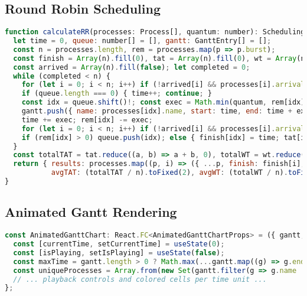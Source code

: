 \documentclass[12pt,a4paper,oneside]{report}
\begin{document}
\subsection*{Round Robin Scheduling}
\begin{lstlisting}[language=JavaScript, caption={Round Robin calculation (excerpt from \texttt{src/app/round-robin/page.tsx}).}]
function calculateRR(processes: Process[], quantum: number): SchedulingResult {
  let time = 0, queue: number[] = [], gantt: GanttEntry[] = [];
  const n = processes.length, rem = processes.map(p => p.burst);
  const finish = Array(n).fill(0), tat = Array(n).fill(0), wt = Array(n).fill(0);
  const arrived = Array(n).fill(false); let completed = 0;
  while (completed < n) {
    for (let i = 0; i < n; i++) if (!arrived[i] && processes[i].arrival <= time) { queue.push(i); arrived[i] = true; }
    if (queue.length === 0) { time++; continue; }
    const idx = queue.shift()!; const exec = Math.min(quantum, rem[idx]);
    gantt.push({ name: processes[idx].name, start: time, end: time + exec });
    time += exec; rem[idx] -= exec;
    for (let i = 0; i < n; i++) if (!arrived[i] && processes[i].arrival <= time) { queue.push(i); arrived[i] = true; }
    if (rem[idx] > 0) queue.push(idx); else { finish[idx] = time; tat[idx] = finish[idx] - processes[idx].arrival; wt[idx] = tat[idx] - processes[idx].burst; completed++; }
  }
  const totalTAT = tat.reduce((a, b) => a + b, 0), totalWT = wt.reduce((a, b) => a + b, 0);
  return { results: processes.map((p, i) => ({ ...p, finish: finish[i], tat: tat[i], wt: wt[i] })),
           avgTAT: (totalTAT / n).toFixed(2), avgWT: (totalWT / n).toFixed(2), gantt };
}
\end{lstlisting}

\subsection*{Animated Gantt Rendering}
\begin{lstlisting}[language=JavaScript, caption={Animated Gantt chart (excerpt from \texttt{src/components/AnimatedGanttChart.tsx}).}]
const AnimatedGanttChart: React.FC<AnimatedGanttChartProps> = ({ gantt, colorScheme, algorithm = "Scheduling" }) => {
  const [currentTime, setCurrentTime] = useState(0);
  const [isPlaying, setIsPlaying] = useState(false);
  const maxTime = gantt.length > 0 ? Math.max(...gantt.map((g) => g.end)) : 10;
  const uniqueProcesses = Array.from(new Set(gantt.filter(g => g.name !== "Idle").map(g => g.name)));
  // ... playback controls and colored cells per time unit ...
};
\end{lstlisting}
\end{document}
